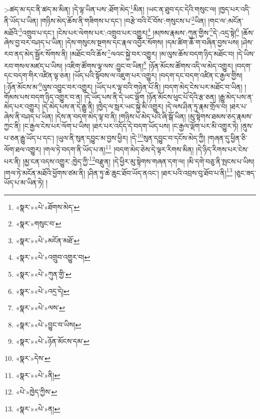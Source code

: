 >ཚད་མ་དང་ནི་ཚད་མ་མིན། །དེ་ལྟ་ཡིན་པས་:ཐོག་མེད་\footnote{«སྣར་»«པེ་»ཐོགས་མེད་}མིན། །ཡང་ན་ཐུབ་དང་དེའི་གསུང་ལ། །ཁྱད་པར་འདི་ནི་ཡོད་པ་ཡིན། །གཉིས་མེད་ཆོས་ནི་གཟིགས་པ་དང་། །བརྩེ་བའི་ངོ་བོས་:གསུངས་པ་\footnote{«སྣར་»གསུང་བ་}ཡིན། །གང་ལ་:མངོན་མཐོའི་\footnote{«སྣར་»«པེ་»མངོན་མཐོ་}འགྲུབ་པ་དང་། །ངེས་པར་ལེགས་པར་:འགྲུབ་པར་འགྱུར།\footnote{«སྣར་»«པེ་»འགྲུབ་འགྱུར་བ།} །མཁས་རྣམས་:ཀུན་གྱིས་\footnote{«སྣར་»«པེ་»ཀུན་གྱི་}དེ་:འདྲ་སྟེ།\footnote{«སྣར་»«པེ་»འདྲ་དེ།} །ཆོས་ཞེས་བྱ་བར་བཤད་པ་ཡིན། །དེས་གསུངས་སྔགས་དང་རྣལ་འབྱོར་སོགས། །དམ་ཚིག་ཆོ་ག་བཞིན་བྱས་པས། །ཤེས་རབ་ནད་མེད་སྦྱོར་སོགས་ནི། །མཐོང་བའི་ཆོས་\footnote{«སྣར་»«པེ་»ལས་}ལའང་སྐྱེ་བར་འགྱུར། །མ་ལུས་ཆོས་བདག་ཉིད་མཐོང་བ། །དེ་ཡིས་རབ་གསལ་མཛད་པ་ཡིས། །འཇིག་ཚོགས་ལྟ་ལས་:བྱུང་བ་ཡིན།\footnote{«སྣར་»«པེ་»བྱུང་བ་ཡིས།} །ཉོན་མོངས་ཚོགས་འདི་ལ་མེད་འགྱུར། །བདག་དང་བདག་གིར་འཛིན་ལྟ་ཅན། །ཡོད་པའི་སྟོབས་ལ་འཇུག་པར་འགྱུར། །བདག་དང་བདག་འཛིན་ང་རྒྱལ་གྱིས། །:ཉོན་མོངས་མ་\footnote{«སྣར་»«པེ་»ཉོན་མོངས་དམ་}ལུས་འབྱུང་བར་འགྱུར། །ཡོད་པར་ལྟ་བའི་གཉེན་པོ་ནི། །བདག་མེད་ངེས་པར་མཐོང་བ་ཡིན། །གོམས་པས་བདག་ཉིད་འགྱུར་བ་ན། །དེ་ཡོད་པས་ནི་དེ་ཡང་ལྡོག །ཉོན་མོངས་ཕུང་པོ་དེའི་རྩ་ཅན། །རྒྱུ་མེད་པས་ན་མེད་པར་འགྱུར། །དེ་མེད་པས་ན་དེ་རྒྱུ་ནི། །ཁྱེད་ལ་སླར་ཡང་སྐྱེ་མི་འགྱུར། །དེ་ལས་ཤིན་ཏུ་རྣམ་གྲོལ་བ། །ཐར་པ་ཞེས་ནི་བཤད་པ་ཡིན། །དེས་ན་བདག་མེད་ལྟ་བ་ནི། །གཉིས་པ་མེད་པའི་ཞི་སྒོ་ཡིན། །མུ་སྟེགས་ཐམས་ཅད་རྣམས་ཀྱང་ནི། །ང་རྒྱལ་ངེས་པར་ལོག་པ་ཡིས། །ཐར་པར་འདོད་དེ་བདག་ཡོད་པས། །ང་རྒྱལ་ལྡོག་པར་མི་འགྱུར་ཏེ། །ནུས་པ་ཅན་རྒྱུ་ཡོད་པ་དང་། །ཡུལ་ནི་སུན་དབྱུང་མ་བྱས་ཕྱིར། །དེ་\footnote{«སྣར་»དེས་}སུན་དབྱུང་བ་དངོས་མེད་ཀྱི། །གཞན་དུ་ཕྱིན་ཅི་ལོག་ཐལ་འགྱུར། །གལ་ཏེ་བདག་ནི་ཡོད་པ་ན།\footnote{«སྣར་»«པེ་»ནི།} །བདག་མེད་ཅེས་དེ་ལྟར་རིགས་མིན། །དེ་ཉིད་རིགས་པར་ངེས་པར་ནི། །མྱ་ངན་འདས་འགྱུར་:ཁྱེད་ཀྱི་\footnote{«པེ་»ཁྱེད་ཀྱིས་}བརྫུན། །དེ་ཕྱིར་མུ་སྟེགས་གཞན་དག་ལ། །མི་དགེ་བཅུ་ནི་སྤངས་པ་ཡིས། །གལ་ཏེ་མངོན་མཐོའི་ཕྱོགས་ཙམ་ནི། །ཤིན་ཏུ་ཆེ་ཆུང་ཐོབ་ཡོད་ནའང་། །ཐར་པའི་འབྲས་བུ་ཐོབ་པ་ནི།\footnote{«སྣར་»«པེ་»ན།} །ཅུང་ཟད་ཡོད་པ་མ་ཡིན་ཏེ། །
